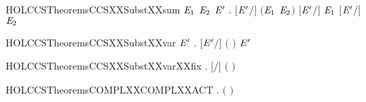 \newcommand{\HOLCCSTheoremsCCSXXSubstXXself}{\UseVerbatim{HOLCCSTheoremsCCSXXSubstXXself}}
\begin{SaveVerbatim}{HOLCCSTheoremsCCSXXSubstXXsum}
\HOLTokenTurnstile{} \HOLSymConst{\HOLTokenForall{}}\ensuremath{\HOLBoundVar{E}\sb{\mathrm{1}}} \ensuremath{\HOLBoundVar{E}\sb{\mathrm{2}}} \ensuremath{\HOLBoundVar{E}\sp{\prime}} . \ensuremath{[}\ensuremath{\HOLBoundVar{E}\sp{\prime}}\ensuremath{/}\ensuremath{]} \ensuremath{(}\ensuremath{\HOLBoundVar{E}\sb{\mathrm{1}}} \HOLSymConst{\ensuremath{+}} \ensuremath{\HOLBoundVar{E}\sb{\mathrm{2}}}\ensuremath{)} \HOLSymConst{\ensuremath{=}} \ensuremath{[}\ensuremath{\HOLBoundVar{E}\sp{\prime}}\ensuremath{/}\ensuremath{]} \ensuremath{\HOLBoundVar{E}\sb{\mathrm{1}}} \HOLSymConst{\ensuremath{+}} \ensuremath{[}\ensuremath{\HOLBoundVar{E}\sp{\prime}}\ensuremath{/}\ensuremath{]} \ensuremath{\HOLBoundVar{E}\sb{\mathrm{2}}}
\end{SaveVerbatim}
\newcommand{\HOLCCSTheoremsCCSXXSubstXXsum}{\UseVerbatim{HOLCCSTheoremsCCSXXSubstXXsum}}
\begin{SaveVerbatim}{HOLCCSTheoremsCCSXXSubstXXvar}
\HOLTokenTurnstile{} \HOLSymConst{\HOLTokenForall{}} \ensuremath{\HOLBoundVar{E}\sp{\prime}} . \ensuremath{[}\ensuremath{\HOLBoundVar{E}\sp{\prime}}\ensuremath{/}\ensuremath{]} \ensuremath{(} \ensuremath{)} \HOLSymConst{\ensuremath{=}}   \HOLSymConst{\ensuremath{=}}   \ensuremath{\HOLBoundVar{E}\sp{\prime}}   
\end{SaveVerbatim}
\newcommand{\HOLCCSTheoremsCCSXXSubstXXvar}{\UseVerbatim{HOLCCSTheoremsCCSXXSubstXXvar}}
\begin{SaveVerbatim}{HOLCCSTheoremsCCSXXSubstXXvarXXfix}
\HOLTokenTurnstile{} \HOLSymConst{\HOLTokenForall{}} . \ensuremath{[}\ensuremath{/}\ensuremath{]} \ensuremath{(} \ensuremath{)} \HOLSymConst{\ensuremath{=}} 
\end{SaveVerbatim}
\newcommand{\HOLCCSTheoremsCCSXXSubstXXvarXXfix}{\UseVerbatim{HOLCCSTheoremsCCSXXSubstXXvarXXfix}}
\begin{SaveVerbatim}{HOLCCSTheoremsCOMPLXXCOMPLXXACT}
\HOLTokenTurnstile{} \HOLSymConst{\HOLTokenForall{}}.  \ensuremath{(} \ensuremath{)} \HOLSymConst{\ensuremath{=}} 
\end{SaveVerbatim}
